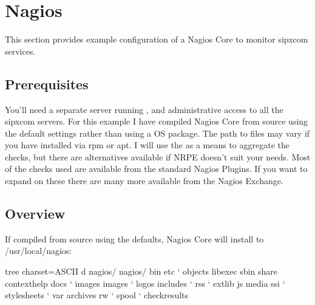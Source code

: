 \documentclass[letterpaper,10pt,english]{sphinxmanual}
\begin{document}
\section{Nagios}
\label{\detokenize{monitoring:id1}}
This section provides example configuration of a Nagios Core to monitor sipxcom services.


\subsection{Prerequisites}
\label{\detokenize{monitoring:prerequisites}}
You’ll need a separate server running , and administrative access to all the sipxcom servers. For this example I have compiled Nagios Core from source using the default settings rather than using a OS package. The path to files may vary if you have installed via rpm or apt. I will use the  as a means to aggregate the checks, but there are alternatives available if NRPE doesn’t suit your needs. Most of the checks used are available from the standard Nagios Plugins. If you want to expand on these there are many more available from the Nagios Exchange.


\subsection{Overview}
\label{\detokenize{monitoring:overview}}
If compiled from source using the defaults, Nagios Core will install to /usr/local/nagios:

\begin{sphinxVerbatim}[commandchars=\\\{\}]
\PYGZsh{} tree \PYGZhy{}\PYGZhy{}charset=ASCII \PYGZhy{}d nagios/
nagios/
\textbar{}\PYGZhy{}\PYGZhy{} bin
\textbar{}\PYGZhy{}\PYGZhy{} etc
\textbar{}   {}`\PYGZhy{}\PYGZhy{} objects
\textbar{}\PYGZhy{}\PYGZhy{} libexec
\textbar{}\PYGZhy{}\PYGZhy{} sbin
\textbar{}\PYGZhy{}\PYGZhy{} share
\textbar{}   \textbar{}\PYGZhy{}\PYGZhy{} contexthelp
\textbar{}   \textbar{}\PYGZhy{}\PYGZhy{} docs
\textbar{}   \textbar{}   {}`\PYGZhy{}\PYGZhy{} images
\textbar{}   \textbar{}\PYGZhy{}\PYGZhy{} images
\textbar{}   \textbar{}   {}`\PYGZhy{}\PYGZhy{} logos
\textbar{}   \textbar{}\PYGZhy{}\PYGZhy{} includes
\textbar{}   \textbar{}   {}`\PYGZhy{}\PYGZhy{} rss
\textbar{}   \textbar{}       {}`\PYGZhy{}\PYGZhy{} extlib
\textbar{}   \textbar{}\PYGZhy{}\PYGZhy{} js
\textbar{}   \textbar{}\PYGZhy{}\PYGZhy{} media
\textbar{}   \textbar{}\PYGZhy{}\PYGZhy{} ssi
\textbar{}   {}`\PYGZhy{}\PYGZhy{} stylesheets
{}`\PYGZhy{}\PYGZhy{} var
    \textbar{}\PYGZhy{}\PYGZhy{} archives
    \textbar{}\PYGZhy{}\PYGZhy{} rw
    {}`\PYGZhy{}\PYGZhy{} spool
        {}`\PYGZhy{}\PYGZhy{} checkresults
\end{sphinxVerbatim}
\end{document}
